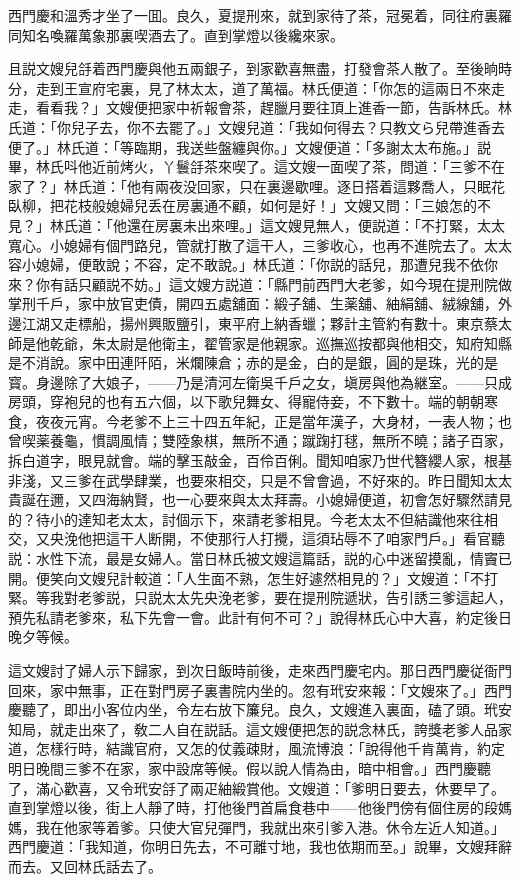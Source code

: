 西門慶和溫秀才坐了一囬。良久，夏提刑來，就到家待了茶，冠冕着，同往府裏羅同知名喚羅萬象那裏喫酒去了。直到掌燈以後纔來家。

且説文嫂兒㧱着西門慶與他五兩銀子，到家歡喜無盡，打發會茶人散了。至後晌時分，走到王宣府宅裏，見了林太太，道了萬福。林氏便道：「你怎的這兩日不來走走，看看我？」文嫂便把家中祈報會茶，趕臘月要往頂上進香一節，告訴林氏。林氏道：「你兒子去，你不去罷了。」文嫂兒道：「我如何得去？只教文ら兒帶進香去便了。」林氏道：「等臨期，我送些盤纏與你。」文嫂便道：「多謝太太布施。」説畢，林氏呌他近前烤火，丫鬟㧱茶來喫了。這文嫂一面喫了茶，問道：「三爹不在家了？」林氏道：「他有兩夜没回家，只在裏邊歇哩。逐日搭着這夥喬人，只眠花臥柳，把花枝般媳婦兒丢在房裏通不顧，如何是好！」文嫂又問：「三娘怎的不見？」林氏道：「他還在房裏未出來哩。」這文嫂見無人，便説道：「不打緊，太太寬心。小媳婦有個門路兒，管就打散了這干人，三爹收心，也再不進院去了。太太容小媳婦，便敢說；不容，定不敢說。」林氏道：「你説的話兒，那遭兒我不依你來？你有話只顧説不妨。」這文嫂方説道：「縣門前西門大老爹，如今現在提刑院做掌刑千戶，家中放官吏債，開四五處舖面：緞子舖、生薬舖、紬絹舖、絨線舖，外邊江湖又走標船，揚州興販鹽引，東平府上納香蠟；夥計主管約有數十。東京蔡太師是他乾爺，朱太尉是他衛主，翟管家是他親家。巡撫巡按都與他相交，知府知縣是不消說。家中田連阡陌，米爛陳倉；赤的是金，白的是銀，圓的是珠，光的是寳。身邊除了大娘子，——乃是清河左衛吳千戶之女，塡房與他為継室。——只成房頭，穿袍兒的也有五六個，以下歌兒舞女、得寵侍妾，不下數十。端的朝朝寒食，夜夜元宵。今老爹不上三十四五年紀，正是當年漢子，大身材，一表人物；也曾喫薬養龜，慣調風情；雙陸象棋，無所不通；蹴踘打毬，無所不曉；諸子百家，拆白道字，眼見就會。端的擊玉敲金，百伶百俐。聞知咱家乃世代簪纓人家，根基非淺，又三爹在武學肆業，也要來相交，只是不曾會過，不好來的。昨日聞知太太貴誕在邇，又四海納賢，也一心要來與太太拜壽。小媳婦便道，初會怎好驟然請見的？待小的達知老太太，討個示下，來請老爹相見。今老太太不但結識他來往相交，又央浼他把這干人断開，不使那行人打攪，這須玷辱不了咱家門戶。」看官聽説：水性下流，最是女婦人。當日林氏被文嫂這篇話，説的心中迷留摸亂，情竇已開。便笑向文嫂兒計較道：「人生面不熟，怎生好遽然相見的？」文嫂道：「不打緊。等我對老爹説，只説太太先央浼老爹，要在提刑院遞狀，告引誘三爹這起人，預先私請老爹來，私下先會一會。此計有何不可？」說得林氏心中大喜，約定後日晚夕等候。

這文嫂討了婦人示下歸家，到次日飯時前後，走來西門慶宅内。那日西門慶従衙門回來，家中無事，正在對門房子裏書院内坐的。忽有玳安來報：「文嫂來了。」西門慶聽了，即出小客位内坐，令左右放下簾兒。良久，文嫂進入裏面，磕了頭。玳安知局，就走出來了，敎二人自在説話。這文嫂便把怎的説念林氏，誇獎老爹人品家道，怎樣行時，結識官府，又怎的仗義疎財，風流博浪：「說得他千肯萬肯，約定明日晚間三爹不在家，家中設席等候。假以說人情為由，暗中相會。」西門慶聽了，滿心歡喜，又令玳安㧱了兩疋紬緞賞他。文嫂道：「爹明日要去，休要早了。直到掌燈以後，街上人靜了時，打他後門首扁食巷中——他後門傍有個住房的段媽媽，我在他家等着爹。只使大官兒彈門，我就出來引爹入港。休令左近人知道。」西門慶道：「我知道，你明日先去，不可離寸地，我也依期而至。」說畢，文嫂拜辭而去。又回林氏話去了。


